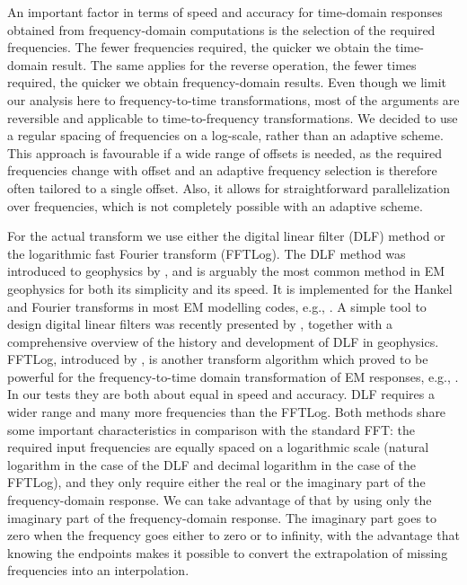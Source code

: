 \documentclass[extra, camera,%
    onecolumn,   %
    referee,     %
]{gji}
\begin{document}
An important factor in terms of speed and accuracy for time-domain responses
obtained from frequency-domain computations is the selection of the required
frequencies. The fewer frequencies required, the quicker we obtain the
time-domain result.  The same applies
for the reverse operation, the fewer times required, the quicker we obtain
frequency-domain results. Even though we limit our analysis here to
frequency-to-time transformations, most of the arguments are reversible and
applicable to time-to-frequency transformations. We decided to use a regular
spacing of frequencies on a log-scale, rather than an adaptive scheme. This
approach is favourable if a wide range of offsets is needed, as the required
frequencies change with offset and an adaptive frequency selection is therefore
often tailored to a single offset. Also,
it allows for straightforward parallelization over frequencies, which is not
completely possible with an adaptive scheme.

For the actual transform we use either the digital linear filter (DLF) method
or the logarithmic fast Fourier transform (FFTLog). The DLF method was
introduced to geophysics by \cite{GP.71.Ghosh}, and is arguably the most common
method in EM geophysics for both its simplicity and its speed. It is
implemented for the Hankel and Fourier transforms in most EM modelling codes,
e.g., \cite{GEO.09.Key}. A simple tool to design digital linear filters was
recently presented by \cite{GEO.19.Werthmuller}, together with a comprehensive
overview of the history and development of DLF in geophysics. FFTLog,
introduced by \cite{RAS.00.Hamilton}, is another transform algorithm which
proved to be powerful for the frequency-to-time domain transformation of EM
responses, e.g., \cite{INT.14.Werthmuller}. In our tests they are both about
equal in speed and accuracy. DLF requires a wider range and many more
frequencies than the FFTLog. Both methods share some important characteristics
in comparison with the standard FFT: the required input frequencies are equally
spaced on a logarithmic scale (natural logarithm in the case of the DLF and
decimal logarithm in the case of the FFTLog), and they only require either the
real or the imaginary part of the frequency-domain response. We can take
advantage of that by using only the imaginary part of the frequency-domain
response. The imaginary part goes to zero when the frequency goes either to
zero or to infinity, with the advantage that knowing the endpoints makes it
possible to convert the extrapolation of missing frequencies into an
interpolation.
\end{document}
